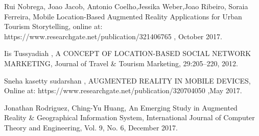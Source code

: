 \renewcommand{\bibname}{REFERENCES}
\cleardoublepage %
\begin{spacing}{1.5}
\begin{thebibliography}{99}

  Rui Nobrega, Joao Jacob, Antonio Coelho,Jessika Weber,Joao Ribeiro, Soraia Ferreira, Mobile Location-Based Augmented Reality
Applications for Urban Tourism Storytelling, online at: https://www.researchgate.net/publication/321406765 , October 2017.

 Iis Tussyadiah
, A CONCEPT OF LOCATION-BASED SOCIAL
NETWORK MARKETING, Journal of Travel \& Tourism Marketing, 29:205–220, 2012.

 Sneha kasetty sudarshan
, AUGMENTED REALITY IN MOBILE DEVICES, Online at: https://www.researchgate.net/publication/320704050 ,May 2017. 

  Jonathan Rodriguez, Ching-Yu Huang, An Emerging Study in Augmented Reality \&
Geographical Information System, International Journal of Computer Theory and Engineering, Vol. 9, No. 6, December 2017. 




 \end{thebibliography}
\end{spacing}
	
\nocite{*}



